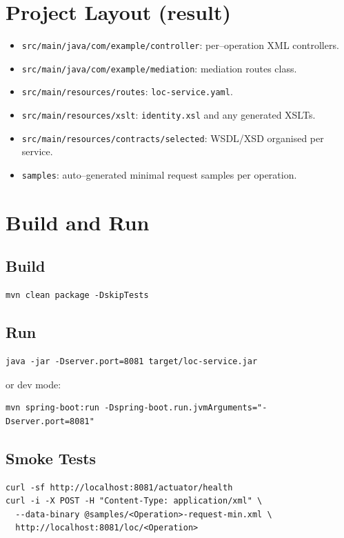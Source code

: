 \documentclass[11pt]{article}
\begin{document}
\section{Project Layout (result)}
\begin{itemize}
  \item \texttt{src/main/java/com/example/controller}: per–operation XML controllers.
  \item \texttt{src/main/java/com/example/mediation}: mediation routes class.
  \item \texttt{src/main/resources/routes}: \texttt{loc-service.yaml}.
  \item \texttt{src/main/resources/xslt}: \texttt{identity.xsl} and any generated XSLTs.
  \item \texttt{src/main/resources/contracts/selected}: WSDL/XSD organised per service.
  \item \texttt{samples}: auto–generated minimal request samples per operation.
\end{itemize}

\section{Build and Run}
\subsection{Build}
\begin{verbatim}
mvn clean package -DskipTests
\end{verbatim}

\subsection{Run}
\begin{verbatim}
java -jar -Dserver.port=8081 target/loc-service.jar
\end{verbatim}
or dev mode:
\begin{verbatim}
mvn spring-boot:run -Dspring-boot.run.jvmArguments="-Dserver.port=8081"
\end{verbatim}

\subsection{Smoke Tests}
\begin{verbatim}
curl -sf http://localhost:8081/actuator/health
curl -i -X POST -H "Content-Type: application/xml" \
  --data-binary @samples/<Operation>-request-min.xml \
  http://localhost:8081/loc/<Operation>
\end{verbatim}
\end{document}
